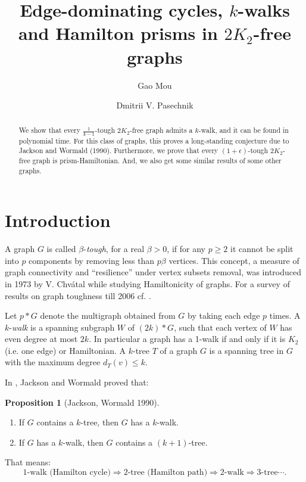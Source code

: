 \documentclass{amsart}
\theoremstyle{definition}
\newtheorem{proposition}{Proposition}
\begin{document}
\author{Gao Mou}
\address{School of Physical and Mathematical Sciences, Nanyang Technological University, Singapore} 
\author{Dmitrii V. Pasechnik}
\address{Department of Computer Science, The University of Oxford, UK}

\title{Edge-dominating cycles, $k$-walks and Hamilton prisms in $2K_2$-free graphs}
\begin{abstract}
We show that every $\frac{1}{k-1}$-tough
$2K_2$-free graph admits a $k$-walk, and it can be found in polynomial time. 
For this class of graphs, this proves a
long-standing conjecture due to Jackson and Wormald (1990).
Furthermore, we prove that every $(1+\epsilon)$-tough $2K_2$-free graph is prism-Hamiltonian.
And, we also get some similar results of some other graphs.
\end{abstract}

\maketitle

\section{Introduction}
A graph $G$ is called $\beta$-{\em tough}, for a real $\beta>0$, if for any $p\geq 2$ it
cannot be split into $p$ components by removing less than $p\beta$ vertices.  
This concept, a measure of graph connectivity and ``resilience'' under vertex subsets removal,
was introduced in 1973 by V. Chv\'{a}tal 
while studying   Hamiltonicity of graphs. For a survey of results on graph toughness till 2006
cf. \cite{MR2221006}.

Let $p*G$ denote the multigraph obtained from $G$ by taking each edge $p$ times. 
A $k$-{\em walk} is a spanning subgraph $W$ of $(2k)*G$, such that each vertex of $W$ 
has even degree at most $2k$. %
In particular a graph has a 1-walk if and only if it is $K_2$ (i.e. one edge) or Hamiltonian.
A $k$-tree $T$ of a graph $G$ is a spanning tree in $G$ with the maximum degree $d_T(v)\le k$.

In \cite{jackson1990k}, Jackson and Wormald proved that:
\begin{proposition}[Jackson, Wormald 1990]
~
\begin{enumerate}
\item If $G$ contains a $k$-tree, then $G$ has a $k$-walk.
\item If $G$ has a $k$-walk, then $G$ contains a $(k+1)$-tree.
\end{enumerate}
\end{proposition}
That means:$$\text{1-walk (Hamilton cycle)}\Rightarrow\text{2-tree (Hamilton path)}\Rightarrow\text{2-walk}\Rightarrow\text{3-tree}\cdots.$$
\end{document}
